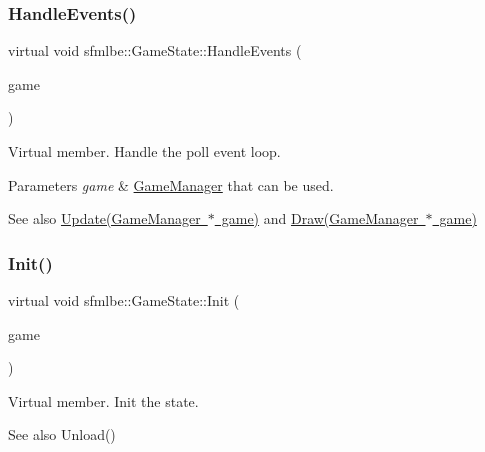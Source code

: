 \subsubsection{\texorpdfstring{Handle\+Events()}{HandleEvents()}}
{\footnotesize\ttfamily virtual void sfmlbe\+::\+Game\+State\+::\+Handle\+Events (\begin{DoxyParamCaption}\item[{\mbox{\hyperlink{classsfmlbe_1_1_game_manager}{Game\+Manager}} $\ast$}]{game }\end{DoxyParamCaption})\hspace{0.3cm}{\ttfamily [pure virtual]}}



Virtual member. Handle the poll event loop. 


\begin{DoxyParams}{Parameters}
{\em game} & \mbox{\hyperlink{classsfmlbe_1_1_game_manager}{Game\+Manager}} that can be used. \\
\hline
\end{DoxyParams}
\begin{DoxySeeAlso}{See also}
\mbox{\hyperlink{classsfmlbe_1_1_game_state_ad3a1e8eb5d0598af841e0095033fa470}{Update(\+Game\+Manager $\ast$ game)}} and \mbox{\hyperlink{classsfmlbe_1_1_game_state_aa0b979c5694e117334eff4d3c1d25908}{Draw(\+Game\+Manager $\ast$ game)}} 
\end{DoxySeeAlso}
\mbox{\label{classsfmlbe_1_1_game_state_acd3f110b2da9986bfe3c5981422457dc}} 
\subsubsection{\texorpdfstring{Init()}{Init()}}
{\footnotesize\ttfamily virtual void sfmlbe\+::\+Game\+State\+::\+Init (\begin{DoxyParamCaption}\item[{\mbox{\hyperlink{classsfmlbe_1_1_game_manager}{Game\+Manager}} $\ast$}]{game }\end{DoxyParamCaption})\hspace{0.3cm}{\ttfamily [pure virtual]}}



Virtual member. Init the state. 

\begin{DoxySeeAlso}{See also}
Unload() 
\end{DoxySeeAlso}
\mbox{\label{classsfmlbe_1_1_game_state_a5a91935e9a6e04754373fb36d08e8358}} 

